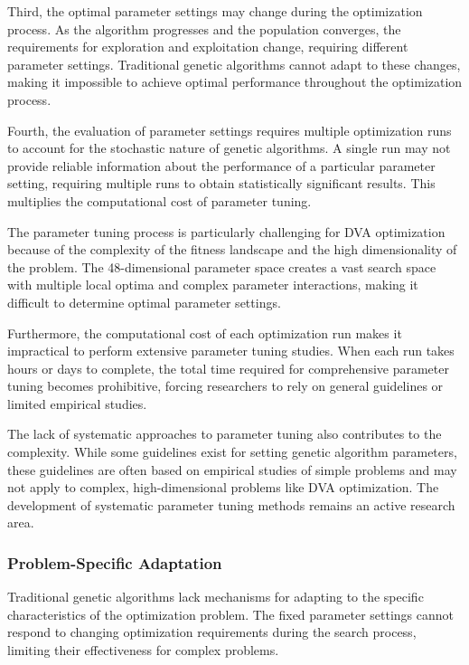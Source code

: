 \documentclass[12pt,a4paper]{article}
\begin{document}
Third, the optimal parameter settings may change during the optimization process. As the algorithm progresses and the population converges, the requirements for exploration and exploitation change, requiring different parameter settings. Traditional genetic algorithms cannot adapt to these changes, making it impossible to achieve optimal performance throughout the optimization process.

Fourth, the evaluation of parameter settings requires multiple optimization runs to account for the stochastic nature of genetic algorithms. A single run may not provide reliable information about the performance of a particular parameter setting, requiring multiple runs to obtain statistically significant results. This multiplies the computational cost of parameter tuning.

The parameter tuning process is particularly challenging for DVA optimization because of the complexity of the fitness landscape and the high dimensionality of the problem. The 48-dimensional parameter space creates a vast search space with multiple local optima and complex parameter interactions, making it difficult to determine optimal parameter settings.

Furthermore, the computational cost of each optimization run makes it impractical to perform extensive parameter tuning studies. When each run takes hours or days to complete, the total time required for comprehensive parameter tuning becomes prohibitive, forcing researchers to rely on general guidelines or limited empirical studies.

The lack of systematic approaches to parameter tuning also contributes to the complexity. While some guidelines exist for setting genetic algorithm parameters, these guidelines are often based on empirical studies of simple problems and may not apply to complex, high-dimensional problems like DVA optimization. The development of systematic parameter tuning methods remains an active research area.

\subsubsection{Problem-Specific Adaptation}

Traditional genetic algorithms lack mechanisms for adapting to the specific characteristics of the optimization problem. The fixed parameter settings cannot respond to changing optimization requirements during the search process, limiting their effectiveness for complex problems.
\end{document}
